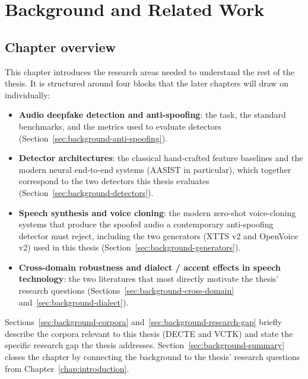 \cleardoubleoddpage
\chapter{Background and Related Work}
\label{chap:background}



\section{Chapter overview}
\label{sec:background-overview}

This chapter introduces the research areas needed to understand the
rest of the thesis. It is structured around four blocks that the
later chapters will draw on individually:

\begin{itemize}
    \item \textbf{Audio deepfake detection and anti-spoofing}: the task,
        the standard benchmarks, and the metrics used to evaluate
        detectors (Section~\ref{sec:background-anti-spoofing}).
    \item \textbf{Detector architectures}: the classical hand-crafted
        feature baselines and the modern neural end-to-end systems
        (AASIST in particular), which together correspond to the two
        detectors this thesis evaluates
        (Section~\ref{sec:background-detectors}).
    \item \textbf{Speech synthesis and voice cloning}: the modern
        zero-shot voice-cloning systems that produce the spoofed
        audio a contemporary anti-spoofing detector must reject,
        including the two generators (XTTS v2 and OpenVoice v2) used
        in this thesis (Section~\ref{sec:background-generators}).
    \item \textbf{Cross-domain robustness and dialect / accent effects in speech
        technology}: the two literatures that most directly motivate
        the thesis' research questions
        (Sections~\ref{sec:background-cross-domain}
        and~\ref{sec:background-dialect}).
\end{itemize}

Sections~\ref{sec:background-corpora} and~\ref{sec:background-research-gap}
briefly describe the corpora relevant to this thesis (DECTE and
VCTK) and state the specific research gap the thesis addresses.
Section~\ref{sec:background-summary} closes the chapter by
connecting the background to the thesis' research questions from
Chapter~\ref{chap:introduction}.


